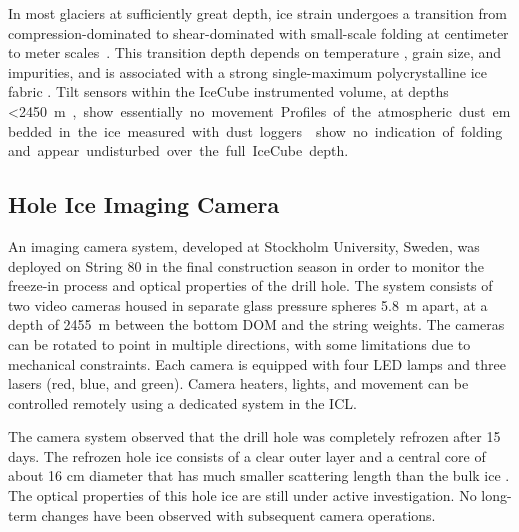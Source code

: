 In most glaciers at sufficiently great depth, ice strain undergoes a
transition from compression-dominated to shear-dominated with
small-scale folding at centimeter to meter scales~\cite{montagnat14,jansen16}.  This transition depth depends on
temperature \cite{price2002temperature}, grain size, and impurities, and is
associated with a strong single-maximum polycrystalline ice fabric
\cite{cuffey10}.  Tilt sensors within the IceCube instrumented volume, at
depths \SI{<2450}m, show essentially no movement.  Profiles of the
atmospheric dust embedded in the ice measured with dust loggers \cite{I3:dustlogger} show no
indication of folding and appear undisturbed over the full IceCube depth.

\subsection{Hole Ice Imaging Camera}

An imaging camera system, developed at Stockholm University, Sweden, was deployed on String 80 in the final
construction season in order to monitor the freeze-in process and optical
properties of the drill hole.  The system consists of two video cameras
housed in separate glass pressure spheres \SI{5.8}{m} apart, at a
depth of \SI{2455}{m} between the bottom DOM and the string
weights. The cameras can be rotated to point in multiple directions, with some
limitations due to mechanical constraints.  Each
camera is equipped with four LED lamps and three lasers (red, blue, and
green).  Camera heaters, lights, and movement can be controlled remotely
using a dedicated system in the ICL.  

The camera system observed that the drill hole was completely refrozen after
15 days.  The refrozen hole ice consists of a clear outer
layer and a central core of about 16 cm diameter that has much
smaller scattering length than the bulk ice \cite{rongen_vlvnt15}.  The
optical properties of this hole ice are still under active investigation.
No long-term changes have been observed with subsequent camera operations.
